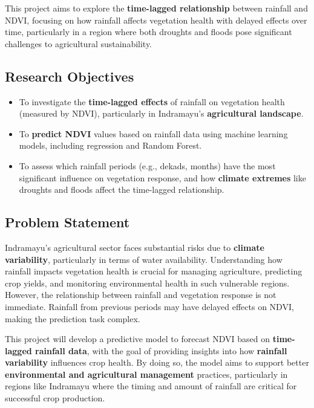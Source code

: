 \documentclass[
]{article}
\providecommand{\tightlist}{%
  \setlength{\itemsep}{0pt}\setlength{\parskip}{0pt}}
\begin{document}
This project aims to explore the \textbf{time-lagged relationship}
between rainfall and NDVI, focusing on how rainfall affects vegetation
health with delayed effects over time, particularly in a region where
both droughts and floods pose significant challenges to agricultural
sustainability.

\subsection{Research Objectives}\label{research-objectives}

\begin{itemize}
\tightlist
\item
  To investigate the \textbf{time-lagged effects} of rainfall on
  vegetation health (measured by NDVI), particularly in Indramayu's
  \textbf{agricultural landscape}.
\item
  To \textbf{predict NDVI} values based on rainfall data using machine
  learning models, including regression and Random Forest.
\item
  To assess which rainfall periods (e.g., dekads, months) have the most
  significant influence on vegetation response, and how \textbf{climate
  extremes} like droughts and floods affect the time-lagged
  relationship.
\end{itemize}

\subsection{Problem Statement}\label{problem-statement}

Indramayu's agricultural sector faces substantial risks due to
\textbf{climate variability}, particularly in terms of water
availability. Understanding how rainfall impacts vegetation health is
crucial for managing agriculture, predicting crop yields, and monitoring
environmental health in such vulnerable regions. However, the
relationship between rainfall and vegetation response is not immediate.
Rainfall from previous periods may have delayed effects on NDVI, making
the prediction task complex.

This project will develop a predictive model to forecast NDVI based on
\textbf{time-lagged rainfall data}, with the goal of providing insights
into how \textbf{rainfall variability} influences crop health. By doing
so, the model aims to support better \textbf{environmental and
agricultural management} practices, particularly in regions like
Indramayu where the timing and amount of rainfall are critical for
successful crop production.
\end{document}
